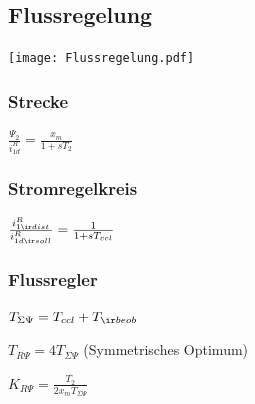 \documentclass[fs, german]{latex4ei_fs}
\begin{document}
\begin{sectionbox}
\subsection{Flussregelung}
\texttt{[image: Flussregelung.pdf]}

\subsubsection*{Strecke}

$\frac{\Psi_2}{i_{1d}^R} = \frac{x_m}{1 + s T_2}$

\subsubsection*{Stromregelkreis}

$\frac{i_{1 \ir dist}^R}{i_{1d \ir soll}^R} = \frac{1}{1 + s T_{ccl}}$

\subsubsection*{Flussregler}
$T_{\Sigma \Psi} = T_{ccl} + T_{\ir beob}$   

$T_{R \Psi} = 4 T_{\Sigma \Psi}$ (Symmetrisches Optimum)

$K_{R \Psi} = \frac{T_2}{2 x_m T_{\Sigma \Psi}}$
\end{sectionbox}
\end{document}

